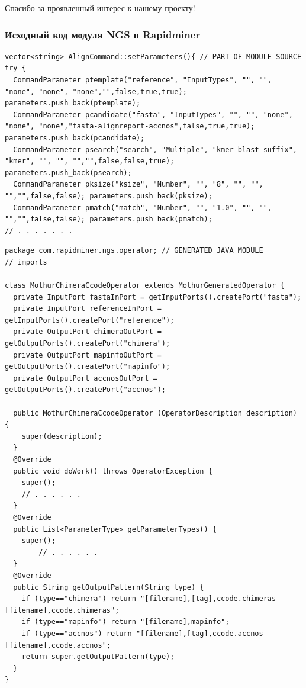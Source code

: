 \documentclass[10pt]{beamer}
\begin{document}
\begin{frame} \begin{center} \Large Спасибо за проявленный интерес к нашему проекту! \end{center} \end{frame}

\begin{frame}[fragile]
  \frametitle{Исходный код модуля NGS в Rapidminer}
\begin{verbatim}
vector<string> AlignCommand::setParameters(){ // PART OF MODULE SOURCE
try {
  CommandParameter ptemplate("reference", "InputTypes", "", "", "none", "none", "none","",false,true,true); parameters.push_back(ptemplate);
  CommandParameter pcandidate("fasta", "InputTypes", "", "", "none", "none", "none","fasta-alignreport-accnos",false,true,true); parameters.push_back(pcandidate);
  CommandParameter psearch("search", "Multiple", "kmer-blast-suffix", "kmer", "", "", "","",false,false,true); parameters.push_back(psearch);
  CommandParameter pksize("ksize", "Number", "", "8", "", "", "","",false,false); parameters.push_back(pksize);
  CommandParameter pmatch("match", "Number", "", "1.0", "", "", "","",false,false); parameters.push_back(pmatch);
// . . . . . . .
\end{verbatim}
\begin{verbatim}
package com.rapidminer.ngs.operator; // GENERATED JAVA MODULE
// imports

class MothurChimeraCcodeOperator extends MothurGeneratedOperator {
  private InputPort fastaInPort = getInputPorts().createPort("fasta");
  private InputPort referenceInPort = getInputPorts().createPort("reference");
  private OutputPort chimeraOutPort = getOutputPorts().createPort("chimera");
  private OutputPort mapinfoOutPort = getOutputPorts().createPort("mapinfo");
  private OutputPort accnosOutPort = getOutputPorts().createPort("accnos");

  public MothurChimeraCcodeOperator (OperatorDescription description) {
    super(description);
  }
  @Override
  public void doWork() throws OperatorException {
    super();
    // . . . . . .
  }
  @Override
  public List<ParameterType> getParameterTypes() {
    super();
        // . . . . . .
  }
  @Override
  public String getOutputPattern(String type) {
    if (type=="chimera") return "[filename],[tag],ccode.chimeras-[filename],ccode.chimeras";
    if (type=="mapinfo") return "[filename],mapinfo";
    if (type=="accnos") return "[filename],[tag],ccode.accnos-[filename],ccode.accnos";
    return super.getOutputPattern(type);
  }
}
\end{verbatim}
\end{frame}
\end{document}
